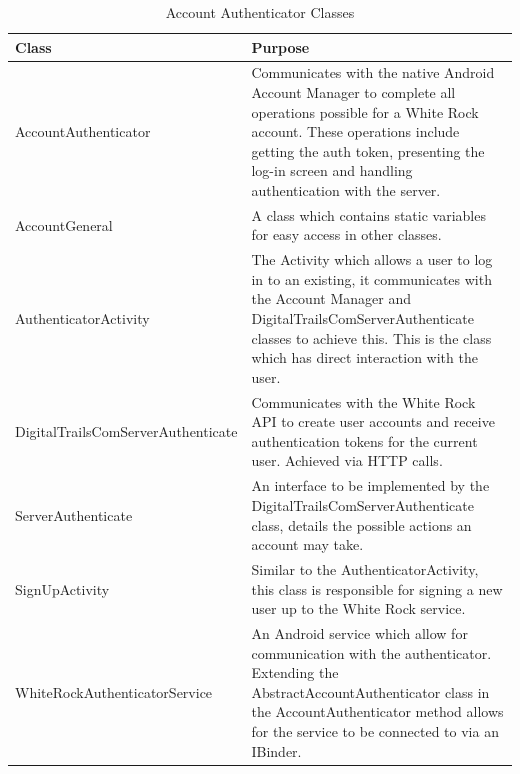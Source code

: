 \documentclass[11pt,a4paper]{report}
\begin{document}
\begin{longtable}{|p{7cm}|p{10cm}|}
\hline \caption{Account Authenticator Classes - Cont. on Next Page} \endfoot
\hline \caption{Account Authenticator Classes} \label{tab:accountauth} \endlastfoot
\hline
\textbf{Class} & \textbf{Purpose} \\ \hline
AccountAuthenticator & Communicates with the native Android Account Manager to complete all operations possible for a White Rock account. These operations include getting the auth token, presenting the log-in screen and handling authentication with the server. \\ \hline
AccountGeneral & A class which contains static variables for easy access in other classes. \\ \hline
AuthenticatorActivity & The Activity which allows a user to log in to an existing, it communicates with the Account Manager and DigitalTrailsComServerAuthenticate classes to achieve this. This is the class which has direct interaction with the user. \\ \hline
DigitalTrailsComServerAuthenticate & Communicates with the White Rock API to create user accounts and receive authentication tokens for the current user. Achieved via HTTP calls.  \\ \hline
ServerAuthenticate & An interface to be implemented by the DigitalTrailsComServerAuthenticate class, details the possible actions an account may take. \\ \hline
SignUpActivity & Similar to the AuthenticatorActivity, this class is responsible for signing a new user up to the White Rock service. \\ \hline
WhiteRockAuthenticatorService & An Android service which allow for communication with the authenticator. Extending the AbstractAccountAuthenticator class in the AccountAuthenticator method allows for the service to be connected to via an IBinder.  \\ \hline
\end{longtable}
\end{document}
